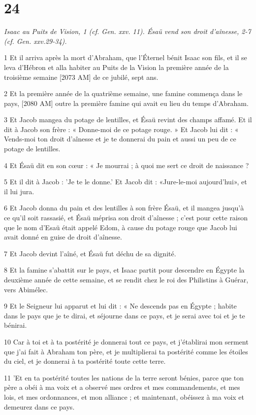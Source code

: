 \chapter{24}

\par \textit{Isaac au Puits de Vision, 1 (cf. Gen. xxv. 11). Ésaü vend son droit d'aînesse, 2-7 (cf. Gen. xxv.29-34).}

\par 1 Et il arriva après la mort d'Abraham, que l'Éternel bénit Isaac son fils, et il se leva d'Hébron et alla habiter au Puits de la Vision la première année de la troisième semaine [2073 AM] de ce jubilé, sept ans.
\par 2 Et la première année de la quatrième semaine, une famine commença dans le pays, [2080 AM] outre la première famine qui avait eu lieu du temps d'Abraham.
\par 3 Et Jacob mangea du potage de lentilles, et Ésaü revint des champs affamé. Et il dit à Jacob son frère : « Donne-moi de ce potage rouge. » Et Jacob lui dit : « Vends-moi ton droit d'aînesse et je te donnerai du pain et aussi un peu de ce potage de lentilles.
\par 4 Et Ésaü dit en son cœur : « Je mourrai ; à quoi me sert ce droit de naissance ?
\par 5 Et il dit à Jacob : 'Je te le donne.' Et Jacob dit : «Jure-le-moi aujourd'hui», et il lui jura.
\par 6 Et Jacob donna du pain et des lentilles à son frère Ésaü, et il mangea jusqu'à ce qu'il soit rassasié, et Ésaü méprisa son droit d'aînesse ; c'est pour cette raison que le nom d'Esaü était appelé Edom, à cause du potage rouge que Jacob lui avait donné en guise de droit d'aînesse.
\par 7 Et Jacob devint l'aîné, et Ésaü fut déchu de sa dignité.
\par 8 Et la famine s'abattit sur le pays, et Isaac partit pour descendre en Égypte la deuxième année de cette semaine, et se rendit chez le roi des Philistins à Guérar, vers Abimélec.
\par 9 Et le Seigneur lui apparut et lui dit : « Ne descends pas en Égypte ; habite dans le pays que je te dirai, et séjourne dans ce pays, et je serai avec toi et je te bénirai.
\par 10 Car à toi et à ta postérité je donnerai tout ce pays, et j'établirai mon serment que j'ai fait à Abraham ton père, et je multiplierai ta postérité comme les étoiles du ciel, et je donnerai à ta postérité toute cette terre.
\par 11 'Et en ta postérité toutes les nations de la terre seront bénies, parce que ton père a obéi à ma voix et a observé mes ordres et mes commandements, et mes lois, et mes ordonnances, et mon alliance ; et maintenant, obéissez à ma voix et demeurez dans ce pays.
